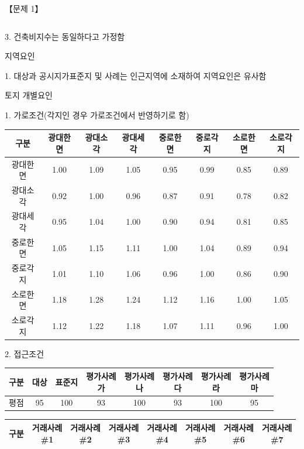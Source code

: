 \begin{longquestion}{【문제 1】}
{\begin{tabular}{|c|c|c|c|c|}
\end{tabular}\par}
3. 건축비지수는 동일하다고 가정함 \par
\medskip{} 지역요인 \par
1. 대상과 공시지가표준지 및 사례는 인근지역에 소재하여 지역요인은 유사함 \par
\medskip{} 토지 개별요인 \par
1. 가로조건(각지인 경우 가로조건에서 반영하기로 함) \par
{\small\centering
\begin{tabular}{|c|c|c|c|c|c|c|c|}\hline
구분 & 광대한면 & 광대소각 & 광대세각 & 중로한면 & 중로각지 & 소로한면 & 소로각지 \\\hline
광대한면 & 1.00 & 1.09 & 1.05 & 0.95 & 0.99 & 0.85 & 0.89 \\\hline
광대소각 & 0.92 & 1.00 & 0.96 & 0.87 & 0.91 & 0.78 & 0.82 \\\hline
광대세각 & 0.95 & 1.04 & 1.00 & 0.90 & 0.94 & 0.81 & 0.85 \\\hline
중로한면 & 1.05 & 1.15 & 1.11 & 1.00 & 1.04 & 0.89 & 0.94 \\\hline
중로각지 & 1.01 & 1.10 & 1.06 & 0.96 & 1.00 & 0.86 & 0.90 \\\hline
소로한면 & 1.18 & 1.28 & 1.24 & 1.12 & 1.16 & 1.00 & 1.05 \\\hline
소로각지 & 1.12 & 1.22 & 1.18 & 1.07 & 1.11 & 0.96 & 1.00 \\\hline
\end{tabular}\par}
2. 접근조건 \par
{\small\centering
\begin{tabular}{|c|c|c|c|c|c|c|c|}\hline
구분 & 대상 & 표준지 & \makecell{평가사례\\가} & \makecell{평가사례\\나} & \makecell{평가사례\\다} & \makecell{평가사례\\라} & \makecell{평가사례\\마} \\\hline
평점 & 95 & 100 & 93 & 100 & 93 & 100 & 95 \\\hline
\end{tabular}\par}
\par{\small\centering
\begin{tabular}{|c|c|c|c|c|c|c|c|}\hline
구분 & \makecell{거래사례\\\#1} & \makecell{거래사례\\\#2} & \makecell{거래사례\\\#3} & \makecell{거래사례\\\#4} & \makecell{거래사례\\\#5} & \makecell{거래사례\\\#6} & \makecell{거래사례\\\#7} \\\hline

\end{tabular}}
\end{longquestion}
